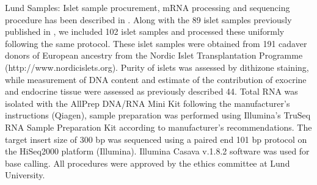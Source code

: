 Lund Samples: Islet sample procurement, mRNA processing and sequencing procedure has been described in \cite{fadistaGlobalGenomicTranscriptomic2014}. Along with the 89 islet samples previously published in \cite{fadistaGlobalGenomicTranscriptomic2014}, we included 102 islet samples and processed these uniformly following the same protocol. These islet samples were obtained from 191 cadaver donors of European ancestry from the Nordic Islet Transplantation Programme (http://www.nordicislets.org). Purity of islets was assessed by dithizone staining, while measurement of DNA content and estimate of the contribution of exocrine and endocrine tissue were assessed as previously described 44. Total RNA was isolated with the AllPrep DNA/RNA Mini Kit following the manufacturer's instructions (Qiagen), sample preparation was performed using Illumina's TruSeq RNA Sample Preparation Kit according to manufacturer's recommendations. The target insert size of 300 bp was sequenced using a paired end 101 bp protocol on the HiSeq2000 platform (Illumina). Illumina Casava v.1.8.2 software was used for base calling. All procedures were approved by the ethics committee at Lund University.
